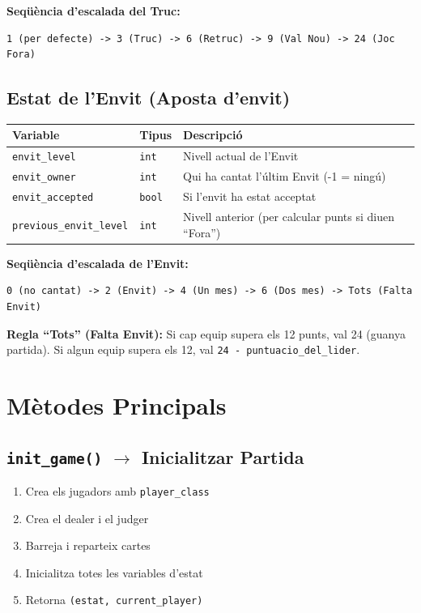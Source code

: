 \documentclass[a4paper,11pt]{report}
\begin{document}
\textbf{Seqüència d'escalada del Truc:}
\begin{verbatim}
1 (per defecte) -> 3 (Truc) -> 6 (Retruc) -> 9 (Val Nou) -> 24 (Joc Fora)
\end{verbatim}

\subsection{Estat de l'Envit (Aposta d'envit)}

\begin{longtable}{|l|l|p{6cm}|}
\hline
\textbf{Variable} & \textbf{Tipus} & \textbf{Descripció} \\
\hline
\texttt{envit\_level} & \texttt{int} & Nivell actual de l'Envit \\
\texttt{envit\_owner} & \texttt{int} & Qui ha cantat l'últim Envit (-1 = ningú) \\
\texttt{envit\_accepted} & \texttt{bool} & Si l'envit ha estat acceptat \\
\texttt{previous\_envit\_level} & \texttt{int} & Nivell anterior (per calcular punts si diuen ``Fora'') \\
\hline
\end{longtable}

\textbf{Seqüència d'escalada de l'Envit:}
\begin{verbatim}
0 (no cantat) -> 2 (Envit) -> 4 (Un mes) -> 6 (Dos mes) -> Tots (Falta Envit)
\end{verbatim}

\noindent\textbf{Regla ``Tots'' (Falta Envit):}
Si cap equip supera els 12 punts, val 24 (guanya partida). Si algun equip supera els 12, val \texttt{24 - puntuacio\_del\_lider}.

\hrulefill

\section{Mètodes Principals}

\subsection{\texttt{init\_game()} $\rightarrow$ Inicialitzar Partida}

\begin{enumerate}
    \item Crea els jugadors amb \texttt{player\_class}
    \item Crea el dealer i el judger
    \item Barreja i reparteix cartes
    \item Inicialitza totes les variables d'estat
    \item Retorna \texttt{(estat, current\_player)}
\end{enumerate}
\end{document}
